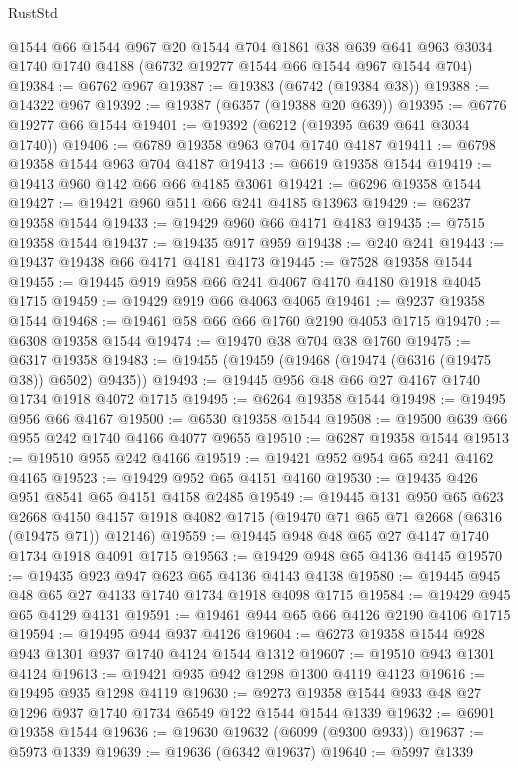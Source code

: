 \begin{lexlean}{RustStd}
\begin{coremodule}
    @1544
    @66
    @1544
    @967
    @20
    @1544
    @704
    @1861
    @38
    @639
    @641
    @963
    @3034
    @1740
    @1740
    @4188
    (@6732 @19277 @1544 @66 @1544 @967 @1544 @704)
@19384 := @6762 @967
@19387 := @19383 (@6742 (@19384 @38))
@19388 := @14322 @967
@19392 := @19387 (@6357 (@19388 @20 @639))
@19395 := @6776 @19277 @66 @1544
@19401 := @19392 (@6212 (@19395 @639 @641 @3034 @1740))
@19406 := @6789 @19358 @963 @704 @1740 @4187
@19411 := @6798 @19358 @1544 @963 @704 @4187
@19413 := @6619 @19358 @1544
@19419 := @19413 @960 @142 @66 @66 @4185 @3061
@19421 := @6296 @19358 @1544
@19427 := @19421 @960 @511 @66 @241 @4185 @13963
@19429 := @6237 @19358 @1544
@19433 := @19429 @960 @66 @4171 @4183
@19435 := @7515 @19358 @1544
@19437 := @19435 @917 @959
@19438 := @240 @241
@19443 := @19437 @19438 @66 @4171 @4181 @4173
@19445 := @7528 @19358 @1544
@19455 := @19445 @919 @958 @66 @241 @4067 @4170 @4180 @1918 @4045 @1715
@19459 := @19429 @919 @66 @4063 @4065
@19461 := @9237 @19358 @1544
@19468 := @19461 @58 @66 @66 @1760 @2190 @4053 @1715
@19470 := @6308 @19358 @1544
@19474 := @19470 @38 @704 @38 @1760
@19475 := @6317 @19358
@19483 := @19455 (@19459 (@19468 (@19474 (@6316 (@19475 @38)) @6502) @9435))
@19493 := @19445 @956 @48 @66 @27 @4167 @1740 @1734 @1918 @4072 @1715
@19495 := @6264 @19358 @1544
@19498 := @19495 @956 @66 @4167
@19500 := @6530 @19358 @1544
@19508 := @19500 @639 @66 @955 @242 @1740 @4166 @4077 @9655
@19510 := @6287 @19358 @1544
@19513 := @19510 @955 @242 @4166
@19519 := @19421 @952 @954 @65 @241 @4162 @4165
@19523 := @19429 @952 @65 @4151 @4160
@19530 := @19435 @426 @951 @8541 @65 @4151 @4158 @2485
@19549 := @19445
    @131
    @950
    @65
    @623
    @2668
    @4150
    @4157
    @1918
    @4082
    @1715
    (@19470 @71 @65 @71 @2668 (@6316 (@19475 @71)) @12146)
@19559 := @19445 @948 @48 @65 @27 @4147 @1740 @1734 @1918 @4091 @1715
@19563 := @19429 @948 @65 @4136 @4145
@19570 := @19435 @923 @947 @623 @65 @4136 @4143 @4138
@19580 := @19445 @945 @48 @65 @27 @4133 @1740 @1734 @1918 @4098 @1715
@19584 := @19429 @945 @65 @4129 @4131
@19591 := @19461 @944 @65 @66 @4126 @2190 @4106 @1715
@19594 := @19495 @944 @937 @4126
@19604 := @6273 @19358 @1544 @928 @943 @1301 @937 @1740 @4124 @1544 @1312
@19607 := @19510 @943 @1301 @4124
@19613 := @19421 @935 @942 @1298 @1300 @4119 @4123
@19616 := @19495 @935 @1298 @4119
@19630 := @9273 @19358 @1544 @933 @48 @27 @1296 @937 @1740 @1734 @6549 @122 @1544 @1544 @1339
@19632 := @6901 @19358 @1544
@19636 := @19630 @19632 (@6099 (@9300 @933))
@19637 := @5973 @1339
@19639 := @19636 (@6342 @19637)
@19640 := @5997 @1339

\end{coremodule}
\end{lexlean}
